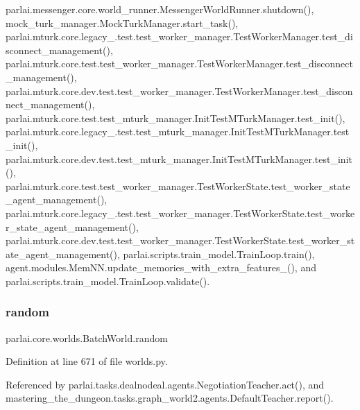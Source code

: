 parlai.\+messenger.\+core.\+world\+\_\+runner.\+Messenger\+World\+Runner.\+shutdown(), mock\+\_\+turk\+\_\+manager.\+Mock\+Turk\+Manager.\+start\+\_\+task(), parlai.\+mturk.\+core.\+legacy\+\_.\+test.\+test\+\_\+worker\+\_\+manager.\+Test\+Worker\+Manager.\+test\+\_\+disconnect\+\_\+management(), parlai.\+mturk.\+core.\+test.\+test\+\_\+worker\+\_\+manager.\+Test\+Worker\+Manager.\+test\+\_\+disconnect\+\_\+management(), parlai.\+mturk.\+core.\+dev.\+test.\+test\+\_\+worker\+\_\+manager.\+Test\+Worker\+Manager.\+test\+\_\+disconnect\+\_\+management(), parlai.\+mturk.\+core.\+test.\+test\+\_\+mturk\+\_\+manager.\+Init\+Test\+M\+Turk\+Manager.\+test\+\_\+init(), parlai.\+mturk.\+core.\+legacy\+\_.\+test.\+test\+\_\+mturk\+\_\+manager.\+Init\+Test\+M\+Turk\+Manager.\+test\+\_\+init(), parlai.\+mturk.\+core.\+dev.\+test.\+test\+\_\+mturk\+\_\+manager.\+Init\+Test\+M\+Turk\+Manager.\+test\+\_\+init(), parlai.\+mturk.\+core.\+test.\+test\+\_\+worker\+\_\+manager.\+Test\+Worker\+State.\+test\+\_\+worker\+\_\+state\+\_\+agent\+\_\+management(), parlai.\+mturk.\+core.\+legacy\+\_.\+test.\+test\+\_\+worker\+\_\+manager.\+Test\+Worker\+State.\+test\+\_\+worker\+\_\+state\+\_\+agent\+\_\+management(), parlai.\+mturk.\+core.\+dev.\+test.\+test\+\_\+worker\+\_\+manager.\+Test\+Worker\+State.\+test\+\_\+worker\+\_\+state\+\_\+agent\+\_\+management(), parlai.\+scripts.\+train\+\_\+model.\+Train\+Loop.\+train(), agent.\+modules.\+Mem\+N\+N.\+update\+\_\+memories\+\_\+with\+\_\+extra\+\_\+features\+\_\+(), and parlai.\+scripts.\+train\+\_\+model.\+Train\+Loop.\+validate().

\mbox{\label{classparlai_1_1core_1_1worlds_1_1BatchWorld_a27b70249faa0bbe4bdff806a3f31ec13}} 
\subsubsection{\texorpdfstring{random}{random}}
{\footnotesize\ttfamily parlai.\+core.\+worlds.\+Batch\+World.\+random}



Definition at line 671 of file worlds.\+py.



Referenced by parlai.\+tasks.\+dealnodeal.\+agents.\+Negotiation\+Teacher.\+act(), and mastering\+\_\+the\+\_\+dungeon.\+tasks.\+graph\+\_\+world2.\+agents.\+Default\+Teacher.\+report().

